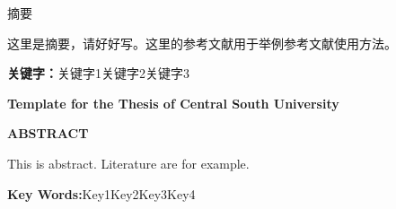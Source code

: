 \vspace*{-21.6pt}
\begin{center}
\heiti
\end{center}
\par
\begin{center}
\heiti
{}
{}
摘要
\end{center}

这里是摘要，请好好写。这里的参考文献用于举例参考文献使用方法\cite{IOTB2}。
\par

\bigskip
\noindent\textbf{关键字：}关键字1\quad 关键字2\quad 关键字3

\newpage
\vspace*{-21.6pt}
\begin{center}
\bfseries
\rmfamily Template for the Thesis of Central South University
\end{center}
\par
{}
{}
\begin{center}
\rmfamily\bfseries
ABSTRACT
\end{center}

\par
This is abstract. Literature are for example\cite{IOTB2}.

\bigskip
\noindent\textbf{Key Words:}\quad Key1\quad Key2\quad Key3\quad Key4
